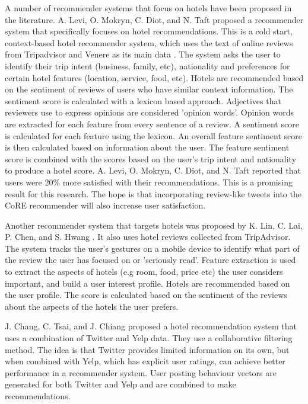 A number of recommender systems that focus on hotels have been proposed in the literature. A. Levi, O. Mokryn, C. Diot, and N. Taft proposed a recommender system that specifically focuses on hotel recommendations. This is a cold start, context-based hotel recommender system, which uses the text of online reviews from Tripadvisor and Venere as its main data \cite{levi2012}. The system asks the user to identify their trip intent (business, family, etc), nationality and preferences for certain hotel features (location, service, food, etc). Hotels are recommended based on the sentiment of reviews of users who have similar context information. The sentiment score is calculated with a lexicon based approach. Adjectives that reviewers use to express opinions are considered 'opinion words'. Opinion words are extracted for each feature from every sentence of a review. A sentiment score is calculated for each feature using the lexicon. An overall feature sentiment score is then calculated based on information about the user. The feature sentiment score is combined with the scores based on the user's trip intent and nationality to produce a hotel score. A. Levi, O. Mokryn, C. Diot, and N. Taft reported that users were 20\% more satisfied with their recommendations. This is a promising result for this research. The hope is that incorporating review-like tweets into the CoRE recommender will also increase user satisfaction. 

Another recommender system that targets hotels was proposed by K. Lin, C. Lai, P. Chen, and S. Hwang \cite{lin2015}. It also uses hotel reviews collected from TripAdvisor. The system tracks the user's gestures on a mobile device to identify what part of the review the user has focused on or 'seriously read'. Feature extraction is used to extract the aspects of hotels (e.g room, food, price etc) the user considers important, and build a user interest profile. Hotels are recommended based on the user profile. The score is calculated based on the sentiment of the reviews about the aspects of the hotels the user prefers.

J. Chang, C. Tsai, and J. Chiang \cite{chang2018} proposed a hotel recommendation system that uses a combination of Twitter and Yelp data. They use a collaborative filtering method. The idea is that Twitter provides limited information on its own, but when combined with Yelp, which has explicit user ratings, can achieve better performance in a recommender system. User posting behaviour vectors are generated for both Twitter and Yelp and are combined to make recommendations.

